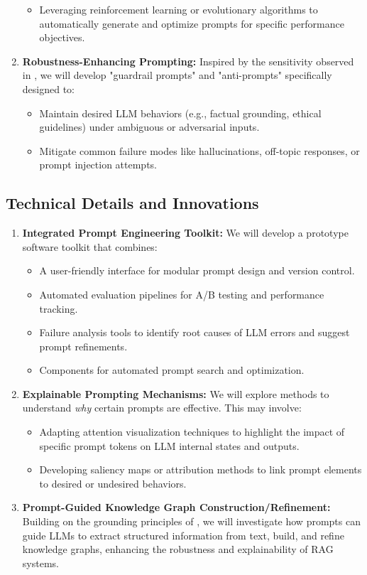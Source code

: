 \documentclass{article}
\newcommand{\citePthree}{\cite{paper3}}
\newcommand{\citePfive}{\cite{paper5}}
\begin{document}
\begin{enumerate}[noitemsep]
\begin{itemize}[noitemsep]
        \item Leveraging reinforcement learning or evolutionary algorithms to automatically generate and optimize prompts for specific performance objectives.
    \end{itemize}
    \item \textbf{Robustness-Enhancing Prompting:} Inspired by the sensitivity observed in \citePthree{}, we will develop "guardrail prompts" and "anti-prompts" specifically designed to:
    \begin{itemize}[noitemsep]
        \item Maintain desired LLM behaviors (e.g., factual grounding, ethical guidelines) under ambiguous or adversarial inputs.
        \item Mitigate common failure modes like hallucinations, off-topic responses, or prompt injection attempts.
    \end{itemize}
\end{enumerate}

\subsection{Technical Details and Innovations}
\begin{enumerate}[noitemsep]
    \item \textbf{Integrated Prompt Engineering Toolkit:} We will develop a prototype software toolkit that combines:
    \begin{itemize}[noitemsep]
        \item A user-friendly interface for modular prompt design and version control.
        \item Automated evaluation pipelines for A/B testing and performance tracking.
        \item Failure analysis tools to identify root causes of LLM errors and suggest prompt refinements.
        \item Components for automated prompt search and optimization.
    \end{itemize}
    \item \textbf{Explainable Prompting Mechanisms:} We will explore methods to understand \textit{why} certain prompts are effective. This may involve:
    \begin{itemize}[noitemsep]
        \item Adapting attention visualization techniques to highlight the impact of specific prompt tokens on LLM internal states and outputs.
        \item Developing saliency maps or attribution methods to link prompt elements to desired or undesired behaviors.
    \end{itemize}
    \item \textbf{Prompt-Guided Knowledge Graph Construction/Refinement:} Building on the grounding principles of \citePfive{}, we will investigate how prompts can guide LLMs to extract structured information from text, build, and refine knowledge graphs, enhancing the robustness and explainability of RAG systems.
\end{enumerate}
\end{document}
